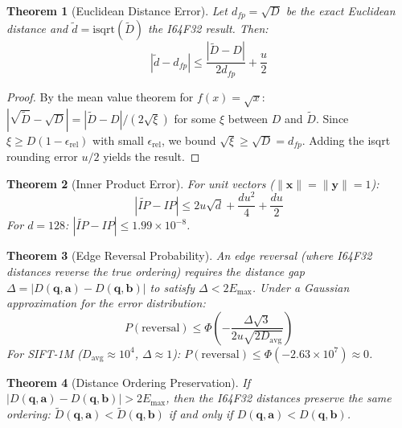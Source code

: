 \documentclass[10pt,journal]{IEEEtran}
\newtheorem{theorem}{Theorem}
\begin{document}
\begin{theorem}[Euclidean Distance Error]
\label{thm:eucl_dist_error}
Let $d_{fp} = \sqrt{D}$ be the exact Euclidean distance and $\tilde{d} = \mathrm{isqrt}(\tilde{D})$ the I64F32 result. Then:
\begin{equation}
  |\tilde{d} - d_{fp}| \leq \frac{|\tilde{D} - D|}{2d_{fp}} + \frac{u}{2}
\end{equation}
\end{theorem}

\begin{proof}
By the mean value theorem for $f(x) = \sqrt{x}$: $|\sqrt{\tilde{D}} - \sqrt{D}| = |\tilde{D} - D| / (2\sqrt{\xi})$ for some $\xi$ between $D$ and $\tilde{D}$. Since $\xi \geq D(1 - \epsilon_{\text{rel}})$ with small $\epsilon_{\text{rel}}$, we bound $\sqrt{\xi} \geq \sqrt{D} = d_{fp}$. Adding the isqrt rounding error $u/2$ yields the result.
\end{proof}

\begin{theorem}[Inner Product Error]
\label{thm:ip_error}
For unit vectors ($\|\mathbf{x}\| = \|\mathbf{y}\| = 1$):
\begin{equation}
  |\widetilde{IP} - IP| \leq 2u\sqrt{d} + \frac{du^2}{4} + \frac{du}{2}
\end{equation}
For $d = 128$: $|\widetilde{IP} - IP| \leq 1.99 \times 10^{-8}$.
\end{theorem}

\begin{theorem}[Edge Reversal Probability]
\label{thm:edge_reversal}
An edge reversal (where I64F32 distances reverse the true ordering) requires the distance gap $\Delta = |D(\mathbf{q}, \mathbf{a}) - D(\mathbf{q}, \mathbf{b})|$ to satisfy $\Delta < 2E_{\max}$. Under a Gaussian approximation for the error distribution:
\begin{equation}
  P(\text{reversal}) \leq \Phi\!\left(-\frac{\Delta\sqrt{3}}{2u\sqrt{2D_{\text{avg}}}}\right)
\end{equation}
For SIFT-1M ($D_{\text{avg}} \approx 10^4$, $\Delta \approx 1$): $P(\text{reversal}) \leq \Phi(-2.63 \times 10^7) \approx 0$.
\end{theorem}

\begin{theorem}[Distance Ordering Preservation]
\label{thm:order_pres}
If $|D(\mathbf{q}, \mathbf{a}) - D(\mathbf{q}, \mathbf{b})| > 2E_{\max}$, then the I64F32 distances preserve the same ordering: $\tilde{D}(\mathbf{q}, \mathbf{a}) < \tilde{D}(\mathbf{q}, \mathbf{b})$ if and only if $D(\mathbf{q}, \mathbf{a}) < D(\mathbf{q}, \mathbf{b})$.
\end{theorem}
\end{document}
